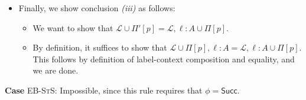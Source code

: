 \documentclass{article}
\newcommand{\mf}[1]{\mathsf{#1}}
\newcommand{\mc}[1]{\mathcal{#1}}
\newcommand{\tb}[1]{\textbf{#1}}
\newcommand{\ts}[1]{\textsc{#1}}
\newcommand{\semi}{\,;\,}
\newcommand{\Ell}{\mc{L}}
\begin{document}
\begin{theorem}
\begin{Proof}
\begin{itemize}
\begin{itemize}
  so this holds.
  \item Finally, we want (8) that
  $\Gamma \semi \Pi' \vdash m'[p].\mf{st}[\ell]: \Pi[p][\ell]$.
  By definition, it suffices that
  $\Gamma \semi \Pi' \vdash v: A$,
  which is given by (3).
  \item By premise \emph{(ii)} and by definition,
  (6)-(8) are sufficient to show that
  $\Gamma \semi \Pi' \vDash m'$,
  i.e. conclusion \emph{(ii)} holds.
\end{itemize}
\item Finally, we show conclusion \emph{(iii)} as follows:
\begin{itemize}
  \item We want to show that 
  $\Ell \cup \Pi'[p] = \Ell, \ell: A \cup \Pi[p]$.
  \item By definition, it suffices to show that 
  $\Ell \cup \Pi[p], \ell: A = \Ell, \ell: A \cup \Pi[p]$.
  This follows by definition of label-context 
  composition and equality, and we are done.
\end{itemize}
\end{itemize}

\tb{Case} \ts{EB-StS}: Impossible, since this rule
requires that $\phi=\mf{Succ}$.
\end{Proof}
\end{theorem}
\end{document}
